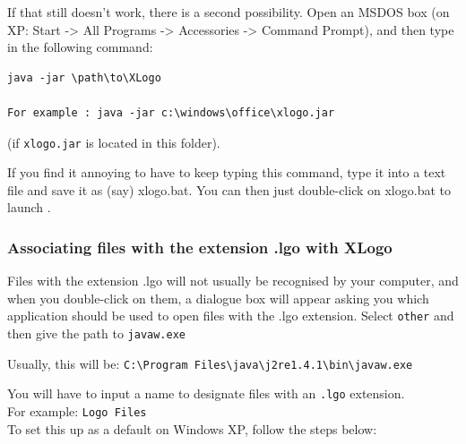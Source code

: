 If that still doesn't work, there is a second possibility.  Open an MSDOS box (on XP: Start -> All Programs -> Accessories -> Command Prompt), and then type in the following command:
\begin{center}
\begin{verbatim}
java -jar \path\to\XLogo

For example : java -jar c:\windows\office\xlogo.jar

\end{verbatim}
(if \texttt{xlogo.jar} is located in this folder).

\end{center}

If you find it annoying to have to keep typing this command, type it into a text file and save it as (say) xlogo.bat.  You can then just double-click on xlogo.bat to launch \xlogo.

\subsubsection*{Associating files with the extension .lgo with XLogo}
Files with the extension .lgo will not usually be recognised by your computer, and when you double-click on them, a dialogue box will appear asking you which application should be used to open files with the .lgo extension. Select \texttt{other} and then give the path to \texttt{javaw.exe} \begin{center}
Usually, this will be: \texttt{C:\textbackslash{}Program Files\textbackslash{}java\textbackslash{}j2re1.4.1\textbackslash{}bin\textbackslash{}javaw.exe}
\end{center}  
You will have to input a name to designate files with an \texttt{.lgo} extension.\\
For example: \texttt{Logo Files}\\
To set this up as a default on Windows XP, follow the steps below:


